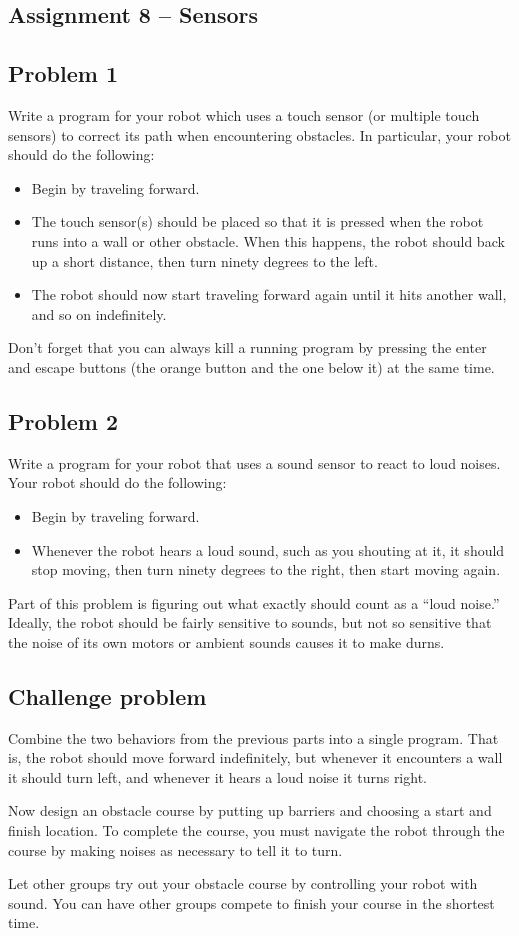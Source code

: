 \documentclass[11pt]{article}
\theoremstyle{plain}
\theoremstyle{definition}
\theoremstyle{remark}
\begin{document}
\begin{center}
\section*{Assignment 8 -- Sensors}
\end{center}
\subsection*{Problem 1}
Write a program for your robot which uses a touch sensor (or multiple touch
sensors) to correct its path when encountering obstacles. In particular, your
robot should do the following:
\begin{itemize}
  \item Begin by traveling forward.
  \item The touch sensor(s) should be placed so that it is pressed when the
    robot runs into a wall or other obstacle. When this happens, the robot
    should back up a short distance, then turn ninety degrees to the left.
  \item The robot should now start traveling forward again until it hits another
    wall, and so on indefinitely.
\end{itemize}
Don't forget that you can always kill a running program by pressing the enter
and escape buttons (the orange button and the one below it) at the same time.
\subsection*{Problem 2}
Write a program for your robot that uses a sound sensor to react to loud noises.
Your robot should do the following:
\begin{itemize}
  \item Begin by traveling forward.
  \item Whenever the robot hears a loud sound, such as you shouting at it, it
    should stop moving, then turn ninety degrees to the right, then start
    moving again.
\end{itemize}
Part of this problem is figuring out what exactly should count as a ``loud
noise.'' Ideally, the robot should be fairly sensitive to sounds, but not so
sensitive that the noise of its own motors or ambient sounds causes it to make
durns.
\subsection*{Challenge problem}
Combine the two behaviors from the previous parts into a single program. That
is, the robot should move forward indefinitely, but whenever it encounters a
wall it should turn left, and whenever it hears a loud noise it turns right.

Now design an obstacle course by putting up barriers and choosing a start and
finish location. To complete the course, you must navigate the robot through the
course by making noises as necessary to tell it to turn.

Let other groups try out your obstacle course by controlling your robot with
sound. You can have other groups compete to finish your course in the shortest
time.
\end{document}
